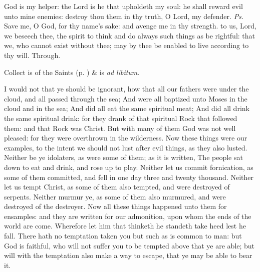 \introit
{} God is my helper: the Lord is he that upholdeth my soul: he shall reward evil unto mine enemies: destroy thou them in thy truth, O Lord, my defender. \textit{Ps.} Save me, O God, for thy name's sake: and avenge me in thy strength.
\collect
{} to us, Lord, we beseech thee, the spirit to think and do always such things as be rightful: that we, who cannot exist without thee; may by thee be enabled to live according to thy will. Through.
\begin{rubric}
     Collect is of the Saints (p. \pageref{SPSaints}) \&  is \emph{ad libitum}.
\end{rubric}
 I would not that ye should be ignorant, how that all our fathers were under the cloud, and all passed through the sea; And were all baptized unto Moses in the cloud and in the sea; And did all eat the same spiritual meat; And did all drink the same spiritual drink: for they drank of that spiritual Rock that followed them: and that Rock was Christ. But with many of them God was not well pleased: for they were overthrown in the wilderness. Now these things were our examples, to the intent we should not lust after evil things, as they also lusted. Neither be ye idolaters, as were some of them; as it is written, The people sat down to eat and drink, and rose up to play. Neither let us commit fornication, as some of them committed, and fell in one day three and twenty thousand. Neither let us tempt Christ, as some of them also tempted, and were destroyed of serpents. Neither murmur ye, as some of them also murmured, and were destroyed of the destroyer. Now all these things happened unto them for ensamples: and they are written for our admonition, upon whom the ends of the world are come. Wherefore let him that thinketh he standeth take heed lest he fall. There hath no temptation taken you but such as is common to man: but God is faithful, who will not suffer you to be tempted above that ye are able; but will with the temptation also make a way to escape, that ye may be able to bear it.


